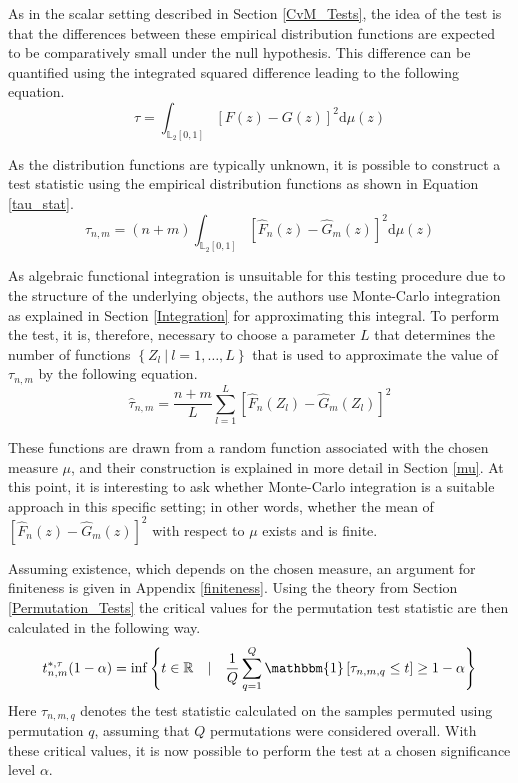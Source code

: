 \documentclass[12pt, a4paper]{article}
\theoremstyle{MAstyle} \newtheorem{assumption}{Assumption}[section]
\theoremstyle{MAstyle} \newtheorem{definition}{Definition}[section]
\theoremstyle{MAstyle} \newtheorem{theorem}{Theorem}[section]
\begin{document}
			As in the scalar setting described in Section \ref{CvM_Tests}, the idea of the test is that the differences between these empirical distribution functions are expected to be comparatively small under the null hypothesis. This difference can be quantified using the integrated squared difference leading to the following equation.
			\begin{equation}
				\tau = \int_{\mathbb{L}_2[0,1]}\left[F(z) - G(z)\right]^2 \mathrm{d} \mu(z)
			\end{equation}
			
			As the distribution functions are typically unknown, it is possible to construct a test statistic using the empirical distribution functions as shown in Equation \ref{tau_stat}.
			\begin{equation}\label{tau_stat}
				\tau_{n,m} = (n+m) \int_{\mathbb{L}_2[0,1]}\left[\hat{F}_n(z) - \hat{G}_m(z)\right]^2 \mathrm{d} \mu(z)
			\end{equation}
		
			As algebraic functional integration is unsuitable for this testing procedure due to the structure of the underlying objects, the authors use Monte-Carlo integration as explained in Section \ref{Integration} for approximating this integral. To perform the test, it is, therefore, necessary to choose a parameter $L$ that determines the number of functions $\left\{Z_l \ \vert \ l = 1, \dots, L\right\}$ that is used to approximate the value of $\tau_{n,m}$ by the following equation.
			\begin{equation}\label{tau_hat}
				\hat{\tau}_{n,m} = \frac{n+m}{L} \sum_{l = 1}^{L} \left[\hat{F}_n(Z_l) - \hat{G}_m(Z_l)\right]^2
			\end{equation}
		
			These functions are drawn from a random function associated with the chosen measure $\mu$, and their construction is explained in more detail in Section \ref{mu}. At this point, it is interesting to ask whether Monte-Carlo integration is a suitable approach in this specific setting; in other words, whether the mean of $\left[\hat{F}_n(z) - \hat{G}_m(z)\right]^2$ with respect to $\mu$ exists and is finite.
			
			Assuming existence, which depends on the chosen measure, an argument for finiteness is given in Appendix \ref{finiteness}.
			Using the theory from Section \ref{Permutation_Tests} the critical values for the permutation test statistic are then calculated in the following way. 
			\begin{equation}
				t^{*, \tau}_{n,m}(1-\alpha) = \inf \left\{t \in \mathbb{R} \quad \vert \quad \frac{1}{Q} \sum_{q = 1}^{Q} \mathbbm{1}\left[\tau_{n,m,q} \leq t\right] \geq 1 - \alpha \right\}
			\end{equation}
			Here $\tau_{n,m,q}$ denotes the test statistic calculated on the samples permuted using permutation $q$, assuming that $Q$ permutations were considered overall. With these critical values, it is now possible to perform the test at a chosen significance level $\alpha$.
		
\end{document}
